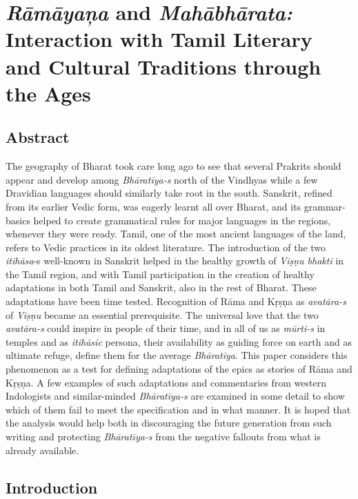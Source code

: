 
\chapter{\textit{Rāmāyaņa} and \textit{Mahābhārata:} Interaction with Tamil Literary and Cultural Traditions through the Ages}\label{chap10}



\section*{Abstract}

The geography of Bharat took care long ago to see that several Prakrits should appear and develop among \textit{Bhāratīya-s} north of the Vindhyas while a few Dravidian languages should similarly take root in the south. Sanskrit, refined from its earlier Vedic form, was eagerly learnt all over Bharat, and its grammar-basics helped to create grammatical rules for major languages in the regions, whenever they were ready. Tamil, one of the most ancient languages of the land, refers to Vedic practices in its oldest literature. The introduction of the two \textit{itihāsa}-s well-known in Sanskrit helped in the healthy growth of \textit{Viṣṇu bhakti} in the Tamil region, and with Tamil participation in the creation of healthy adaptations in both Tamil and Sanskrit, also in the rest of Bharat. These adaptations have been time tested. Recognition of Rāma and Kṛṣṇa as \textit{avatāra-s} of \textit{Viṣṇu} became an essential prerequisite. The universal love that the two \textit{avatāra-s} could inspire in people of their time, and in all of us as \textit{mūrti-s} in temples and as \textit{itihāsic} persona, their availability as guiding force on earth and as ultimate refuge, define them for the average \textit{Bhāratīya}. This paper considers this phenomenon as a test for defining adaptations of the epics as stories of Rāma and Kṛṣṇa. A few examples of such adaptations and commentaries from western Indologists and similar-minded \textit{Bhāratīya-s} are examined in some detail to show which of them fail to meet the specification and in what manner. It is hoped that the analysis would help both in discouraging the future generation from such writing and protecting \textit{Bhāratīya-s} from the negative fallouts from what is already available.


\section*{Introduction}

